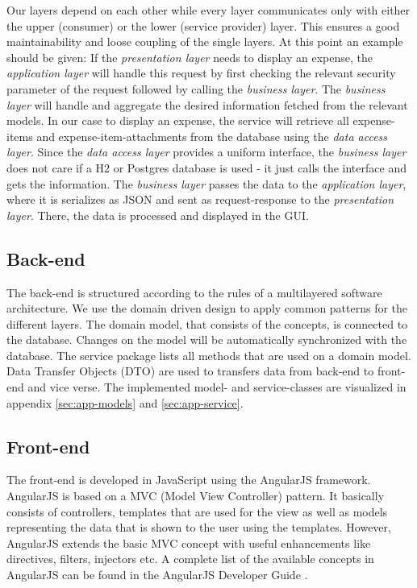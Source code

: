 Our layers depend on each other while every layer communicates only with either the upper (consumer) or the lower (service provider) layer. This ensures a good maintainability and loose coupling of the single layers.\newline
At this point an example should be given: If the \textit{presentation layer} needs to display an expense, the \textit{application layer} will handle this request by first checking the relevant security parameter of the request followed by calling the \textit{business layer}. The \textit{business layer} will handle and aggregate the desired information fetched from the relevant models. In our case to display an expense, the service will retrieve all expense-items and expense-item-attachments from the database using the \textit{data access layer}. Since the \textit{data access layer} provides a uniform interface, the \textit{business layer} does not care if a H2 or Postgres database is used - it just calls the interface and gets the information. The \textit{business layer} passes the data to the \textit{application layer}, where it is serializes as JSON and sent as request-response to the \textit{presentation layer}. There, the data is processed and displayed in the GUI.

\subsection{Back-end}
The back-end is structured according to the rules of a multilayered software architecture. We use the domain driven design \cite{ddd} to apply common patterns for the different layers. The domain model, that consists of the concepts, is connected to the database. Changes on the model will be automatically synchronized with the database. The service package lists all methods that are used on a domain model.\newline
Data Transfer Objects (DTO) are used to transfers data from back-end to front-end and vice verse. \newline 
The implemented model- and service-classes are visualized in appendix \ref{sec:app-models} and \ref{sec:app-service}.

\subsection{Front-end}
The front-end is developed in JavaScript using the AngularJS framework\cite{angular}. AngularJS is based on a MVC (Model View Controller) pattern. It basically consists of controllers, templates that are used for the view  as well as models representing the data that is shown to the user using the templates. However, AngularJS  extends the basic MVC concept with useful enhancements like directives, filters, injectors etc. A complete list of the available concepts in AngularJS can be found in the AngularJS Developer Guide \cite{angular-devguide}.

